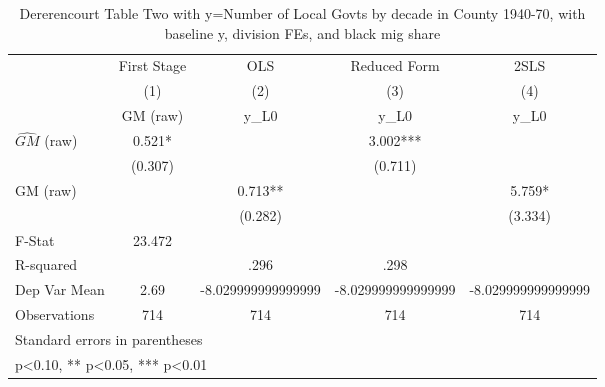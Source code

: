 \begin{table}[htbp]\centering
\def\sym#1{\ifmmode^{#1}\else\(^{#1}\)\fi}
\caption{Dererencourt Table Two with y=Number of Local Govts by decade in County 1940-70, with baseline y, division FEs, and black mig share}
\begin{tabular}{l*{4}{c}}
\toprule
                    & First Stage   &         OLS   &Reduced Form   &        2SLS   \\
                    &\multicolumn{1}{c}{(1)}&\multicolumn{1}{c}{(2)}&\multicolumn{1}{c}{(3)}&\multicolumn{1}{c}{(4)}\\
                    &\multicolumn{1}{c}{GM  (raw)}&\multicolumn{1}{c}{y\_L0}&\multicolumn{1}{c}{y\_L0}&\multicolumn{1}{c}{y\_L0}\\
\midrule
$\hat{GM}$ (raw)    &       0.521*  &               &       3.002***&               \\
                    &     (0.307)   &               &     (0.711)   &               \\
\addlinespace
GM  (raw)           &               &       0.713** &               &       5.759*  \\
                    &               &     (0.282)   &               &     (3.334)   \\
\midrule
F-Stat              &      23.472   &               &               &               \\
R-squared           &               &        .296   &        .298   &               \\
Dep Var Mean        &        2.69   &-8.029999999999999   &-8.029999999999999   &-8.029999999999999   \\
Observations        &         714   &         714   &         714   &         714   \\
\bottomrule
\multicolumn{5}{l}{\footnotesize Standard errors in parentheses}\\
\multicolumn{5}{l}{\footnotesize * p<0.10, ** p<0.05, *** p<0.01}\\
\end{tabular}
\end{table}

